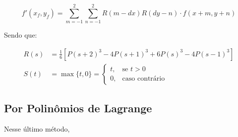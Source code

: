 \[
    f'(x_f, y_f) = \sum_{m = -1}^2 \sum_{n = -1}^2 R(m - dx) R(dy - n) \cdot f(x + m, y + n)
\]

Sendo que:

\begin{align*}
    R(s) &= \frac{1}{6} \left[P(s + 2)^3 - 4 P(s+1)^3 + 6 P(s)^3 - 4 P(s-1)^3\right] \\
    S(t) &= \max\{t, 0\} = \begin{cases}
        t, & \text{se } t > 0 \\
        0, & \text{caso contrário}
    \end{cases}
\end{align*}

\subsection{Por Polinômios de Lagrange} \label{sec:interp:lagrange}

Nesse último método,
